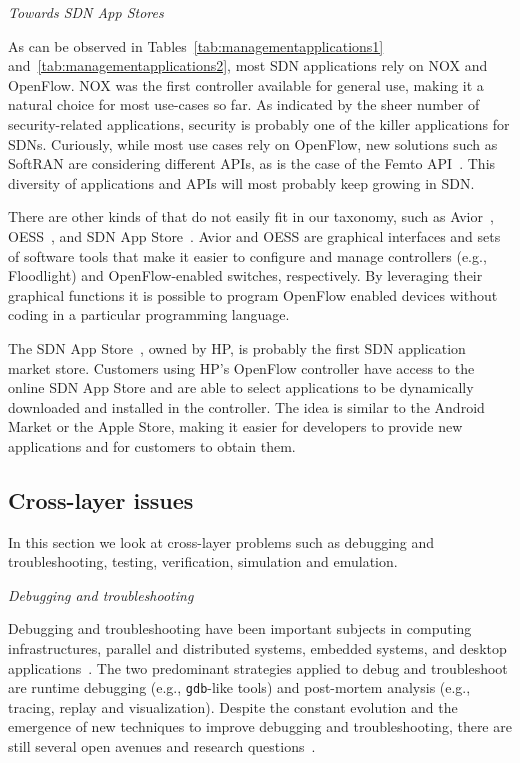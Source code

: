 \vspace{2mm}
\noindent \textit{Towards SDN App Stores}

As can be observed in Tables~\ref{tab:managementapplications1} and~\ref{tab:managementapplications2}, most SDN applications rely on NOX and OpenFlow.
NOX was the first controller available for general use, making it a natural choice for most use-cases so far.
As indicated by the sheer number of security-related applications, security is probably one of the killer 
applications for SDNs. Curiously, while most use cases rely on OpenFlow, new solutions such as SoftRAN are 
considering different APIs, as is the case of the Femto API~\cite{smallcellforum2013,Chandrasekhar2008}. This diversity of 
applications and APIs will most probably keep growing in SDN.

There are other kinds of \manapps that do not easily fit in our taxonomy, such as Avior~\cite{parraga2013}, OESS~\cite{globalnoc2013}, and SDN App Store~\cite{duckett2013,hp2013-2}.
Avior and OESS are graphical interfaces and sets of software tools that make it easier to configure and manage controllers (e.g., Floodlight) and OpenFlow-enabled switches, respectively.
By leveraging their graphical functions it is possible to program OpenFlow enabled devices without coding in a particular programming language.

The SDN App Store~\cite{duckett2013,hp2013-2}, owned by HP, is probably the first SDN 
application market store. Customers using HP's OpenFlow controller have access to the online SDN App Store 
and are able to select applications to be dynamically downloaded and installed in the controller. 
The idea is similar to the Android Market or the Apple Store, making it easier for developers to provide 
new applications and for customers to obtain them.

\subsection{Cross-layer issues}
\label{sec:debuggingandtroubleshooting}

In this section we look at cross-layer problems such as debugging and troubleshooting, testing, verification, simulation and emulation.

\vspace{2mm}
\noindent \textit{Debugging and troubleshooting}

Debugging and troubleshooting have been important subjects in computing infrastructures, 
parallel and distributed systems, embedded systems, and desktop 
applications~\cite{sigelman2010,layman2013,erlingsson2012,tomaselli2013,tan2010,fonseca2007,trivedi2014}. 
The two predominant strategies applied to debug and troubleshoot are runtime debugging 
(e.g., \texttt{gdb}-like tools) and post-mortem analysis (e.g., tracing, replay and visualization).
Despite the constant evolution and the emergence of new techniques to improve debugging and troubleshooting, 
there are still several open avenues and research questions~\cite{layman2013}.

